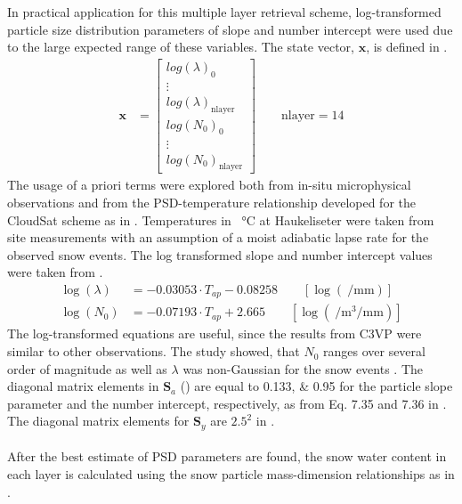\\
\\
In practical application for this multiple layer retrieval scheme, log-transformed particle size distribution parameters of slope and number intercept were used due to the large expected range of these variables. The state vector, $\mathbf{x}$, is defined in .
\begin{align}
	\mathbf{x} & = \begin{bmatrix}
		log(\lambda)_0 	\\
		\vdots 			\\
		log(\lambda)_{\text{nlayer}} 	\\
		log(N_0)_0		\\
		\vdots			\\
		log(N_0)_{\text{nlayer}}		
	\end{bmatrix} \qquad \text{nlayer} = 14
	\label{eq:snow_prop}
\end{align}
The usage of a priori terms were explored both from in-situ microphysical observations and from the PSD-temperature relationship developed for the CloudSat scheme as in . Temperatures in \SI{}{\celsius} at Haukeliseter were taken from site measurements with an assumption of a moist adiabatic lapse rate for the observed snow events. The log transformed slope and number intercept values were taken from \citet{wood_estimation_2011}. 
\begin{align}
	\log(\lambda) & = -0.03053 \cdot T_{ap} - 0.08258  \label{eq:lambda} \qquad [ \log(\SI{}{\per\mm}) ] \\
	\log(N_0) & = -0.07193 \cdot T_{ap} +2.665  \qquad [ \log(\SI{}{\per\cubic\metre\per\mm})]
	\label{eq:N0}
\end{align}
The log-transformed equations are useful, since the results from C3VP were similar to other observations. The study showed, that $N_0$ ranges over several order of magnitude as well as $\lambda$ was non-Gaussian for the snow events \citet{wood_estimation_2011}. The diagonal matrix elements in $\mathbf{S}_a$ () are equal to \numlist{0.133;0.95} for the particle slope parameter and the number intercept, respectively, as from Eq. 7.35 and 7.36 in \citet{wood_estimation_2011}. The diagonal matrix elements for $\mathbf{S}_y$ are $2.5^2$ in .
\\
\\
After the best estimate of PSD parameters are found, the snow water content in each layer is calculated using the snow particle mass-dimension relationships as in . 
